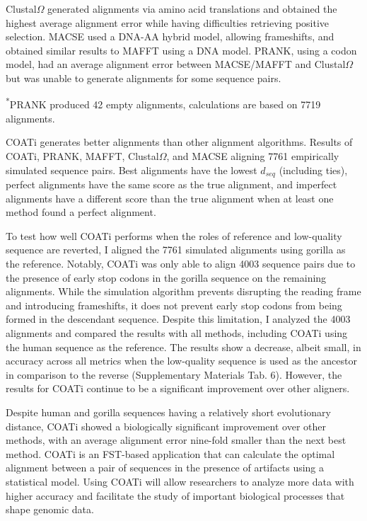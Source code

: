 \documentclass[12pt,letterpaper]{article}
\begin{document}
Clustal$\Omega$ generated alignments via amino acid translations and obtained the highest average alignment error while having difficulties retrieving positive selection.
MACSE used a DNA-AA hybrid model, allowing frameshifts, and obtained similar results to MAFFT using a DNA model.
PRANK, using a codon model, had an average alignment error between MACSE/MAFFT and Clustal$\Omega$ but was unable to generate alignments for some sequence pairs.

\begin{table}[!ht]
\centering

 \vspace{1mm}
 \footnotesize{\textsuperscript{*}PRANK produced 42 empty alignments, calculations are based on 7719 alignments.}
 \caption{COATi generates better alignments than other alignment algorithms. Results of COATi, PRANK, MAFFT, Clustal$\Omega$, and MACSE aligning 7761 empirically simulated sequence pairs. Best alignments have the lowest $d_{seq}$ (including ties), perfect alignments have the same score as the true alignment, and imperfect alignments have a different score than the true alignment when at least one method found a perfect alignment.}
 \label{table:comp}
\end{table}

To test how well COATi performs when the roles of reference and low-quality sequence are reverted, I aligned the 7761 simulated alignments using gorilla as the reference. Notably, COATi was only able to align 4003 sequence pairs due to the presence of early stop codons in the gorilla sequence on the remaining alignments. While the simulation algorithm prevents disrupting the reading frame and introducing frameshifts, it does not prevent early stop codons from being formed in the descendant sequence. Despite this limitation, I analyzed the 4003 alignments and compared the results with all methods, including COATi using the human sequence as the reference. The results show a decrease, albeit small, in accuracy across all metrics when the low-quality sequence is used as the ancestor in comparison to the reverse (Supplementary Materials Tab. 6). However, the results for COATi continue to be a significant improvement over other aligners.

Despite human and gorilla sequences having a relatively short evolutionary distance, COATi showed a biologically significant improvement over other methods, with an average alignment error nine-fold smaller than the next best method.
COATi is an FST-based application that can calculate the optimal alignment between a pair of sequences in the presence of artifacts using a statistical model.
Using COATi will allow researchers to analyze more data with higher accuracy and facilitate the study of important biological processes that shape genomic data.
\end{document}
